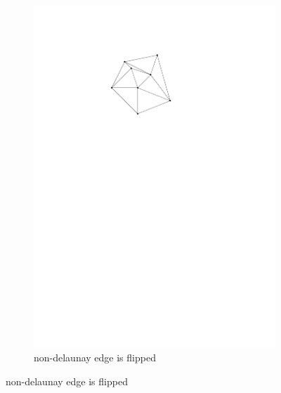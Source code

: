 \begin{figure}[h]
\begin{subfigure}[t]{0.5\textwidth}
        \includegraphics{images/law_flip_b.pdf}
        \caption{non-delaunay edge is flipped}
    \end{subfigure}
    

\end{figure}
